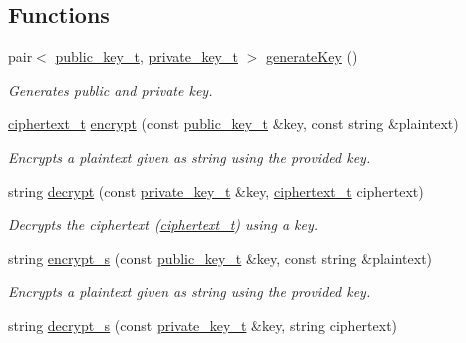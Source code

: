 \subsection*{Functions}
\begin{DoxyCompactItemize}
\item 
pair$<$ \mbox{\hyperlink{structelGamal_1_1public__key__t}{public\+\_\+key\+\_\+t}}, \mbox{\hyperlink{structelGamal_1_1private__key__t}{private\+\_\+key\+\_\+t}} $>$ \mbox{\hyperlink{namespaceelGamal_a146d7e0430b165ea18111d6342b7888b}{generate\+Key}} ()
\begin{DoxyCompactList}\small\item\em Generates public and private key. \end{DoxyCompactList}\item 
\mbox{\hyperlink{structelGamal_1_1ciphertext__t}{ciphertext\+\_\+t}} \mbox{\hyperlink{namespaceelGamal_aea2534e80b8368b1dd998cff835ef643}{encrypt}} (const \mbox{\hyperlink{structelGamal_1_1public__key__t}{public\+\_\+key\+\_\+t}} \&key, const string \&plaintext)
\begin{DoxyCompactList}\small\item\em Encrypts a plaintext given as string using the provided key. \end{DoxyCompactList}\item 
string \mbox{\hyperlink{namespaceelGamal_a7d43bd19f4fbfe6cca1232a7b2f23af6}{decrypt}} (const \mbox{\hyperlink{structelGamal_1_1private__key__t}{private\+\_\+key\+\_\+t}} \&key, \mbox{\hyperlink{structelGamal_1_1ciphertext__t}{ciphertext\+\_\+t}} ciphertext)
\begin{DoxyCompactList}\small\item\em Decrypts the ciphertext (\mbox{\hyperlink{structelGamal_1_1ciphertext__t}{ciphertext\+\_\+t}}) using a key. \end{DoxyCompactList}\item 
string \mbox{\hyperlink{namespaceelGamal_af1b50ebf015473027eadf9ba9f12ba95}{encrypt\+\_\+s}} (const \mbox{\hyperlink{structelGamal_1_1public__key__t}{public\+\_\+key\+\_\+t}} \&key, const string \&plaintext)
\begin{DoxyCompactList}\small\item\em Encrypts a plaintext given as string using the provided key. \end{DoxyCompactList}\item 
string \mbox{\hyperlink{namespaceelGamal_a91138d747c43e157f27fe43d0f338808}{decrypt\+\_\+s}} (const \mbox{\hyperlink{structelGamal_1_1private__key__t}{private\+\_\+key\+\_\+t}} \&key, string ciphertext)

\end{DoxyCompactItemize}
